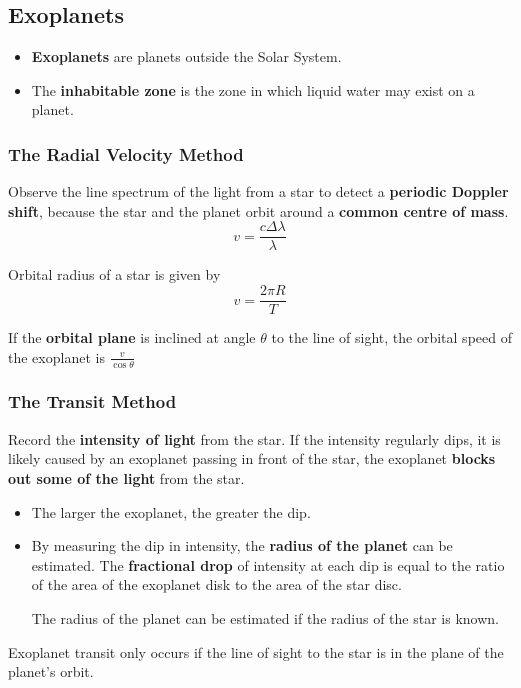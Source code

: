 \subsection{Exoplanets}

\begin{itemize}
    \item \textbf{Exoplanets} are planets outside the Solar System.
    \item The \textbf{inhabitable zone} is the zone in which liquid water may exist on a planet.
\end{itemize}

\subsubsection*{The Radial Velocity Method}

Observe the line spectrum of the light from a star to detect a \textbf{periodic Doppler shift}, because the star and the planet orbit around a \textbf{common centre of mass}.
$$v=\frac{c\Delta\lambda}{\lambda}$$

Orbital radius of a star is given by
$$v=\frac{2\pi R}{T}$$

If the \textbf{orbital plane} is inclined at angle $\theta$ to the line of sight, the orbital speed of the exoplanet is $\frac{v}{\cos\theta}$

\subsubsection*{The Transit Method}

Record the \textbf{intensity of light} from the star. If the intensity regularly dips, it is likely caused by an exoplanet passing in front of the star, the exoplanet \textbf{blocks out some of the light} from the star.
\begin{itemize}
    \item The larger the exoplanet, the greater the dip.
    \item By measuring the dip in intensity, the \textbf{radius of the planet} can be estimated. The \textbf{fractional drop} of intensity at each dip is equal to the ratio of the area of the exoplanet disk to the area of the star disc.

        The radius of the planet can be estimated if the radius of the star is known.
\end{itemize}

Exoplanet transit only occurs if the line of sight to the star is in the plane of the planet's orbit.
